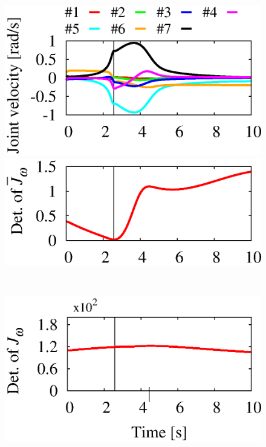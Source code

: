 \begin{figure}[t]
  \centering
  \begin{minipage}[t]{0.40\linewidth}
    \centering
    \includegraphics[width=1.0\linewidth]{fig/chapter4/inspection/singularity/SAMPLE/U01_joint_velo.eps}
  \end{minipage}
  \begin{minipage}[t]{0.40\linewidth}
    \centering
    \includegraphics[width=1.0\linewidth]{fig/chapter4/inspection/singularity/SAMPLE/U16_determinant_Gw.eps}
  \end{minipage}\\
  \vspace{-5mm}
  \begin{minipage}[t]{0.40\linewidth}
    \centering
    \includegraphics[width=1.0\linewidth]{fig/chapter4/inspection/singularity/SAMPLE/U14_determinant_Jw.eps}

\end{minipage}
\end{figure}
